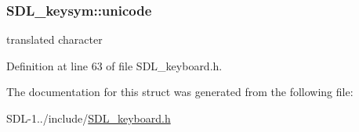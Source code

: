 \subsubsection[{unicode}]{ S\+D\+L\+\_\+keysym\+::unicode}\label{struct_s_d_l__keysym_a683a8e5de4e6dc6de95f670f6275cb0c}
translated character 

Definition at line 63 of file S\+D\+L\+\_\+keyboard.\+h.



The documentation for this struct was generated from the following file\+:\begin{DoxyCompactItemize}
\item 
S\+D\+L-\/1../include/\hyperlink{_s_d_l__keyboard_8h}{S\+D\+L\+\_\+keyboard.\+h}\end{DoxyCompactItemize}
